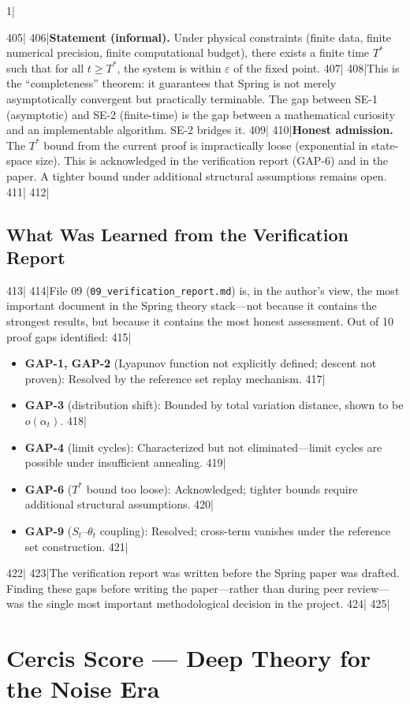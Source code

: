 1|\documentclass[12pt,a4paper]{article}
\begin{document}
405|
406|\textbf{Statement (informal).} Under physical constraints (finite data, finite numerical precision, finite computational budget), there exists a finite time $T^*$ such that for all $t \geq T^*$, the system is within $\varepsilon$ of the fixed point.
407|
408|This is the ``completeness'' theorem: it guarantees that Spring is not merely asymptotically convergent but practically terminable. The gap between SE-1 (asymptotic) and SE-2 (finite-time) is the gap between a mathematical curiosity and an implementable algorithm. SE-2 bridges it.
409|
410|\textbf{Honest admission.} The $T^*$ bound from the current proof is impractically loose (exponential in state-space size). This is acknowledged in the verification report (GAP-6) and in the paper. A tighter bound under additional structural assumptions remains open.
411|
412|\subsection{What Was Learned from the Verification Report}
413|
414|File 09 (\texttt{09\_verification\_report.md}) is, in the author's view, the most important document in the Spring theory stack—not because it contains the strongest results, but because it contains the most honest assessment. Out of 10 proof gaps identified:
415|\begin{itemize}
416|\item \textbf{GAP-1, GAP-2} (Lyapunov function not explicitly defined; descent not proven): Resolved by the reference set replay mechanism.
417|\item \textbf{GAP-3} (distribution shift): Bounded by total variation distance, shown to be $o(\alpha_t)$.
418|\item \textbf{GAP-4} (limit cycles): Characterized but not eliminated—limit cycles are possible under insufficient annealing.
419|\item \textbf{GAP-6} ($T^*$ bound too loose): Acknowledged; tighter bounds require additional structural assumptions.
420|\item \textbf{GAP-9} ($S_t$–$\theta_t$ coupling): Resolved; cross-term vanishes under the reference set construction.
421|\end{itemize}
422|
423|The verification report was written before the Spring paper was drafted. Finding these gaps before writing the paper—rather than during peer review—was the single most important methodological decision in the project.
424|
425|\section{Cercis Score — Deep Theory for the Noise Era}
\end{document}
